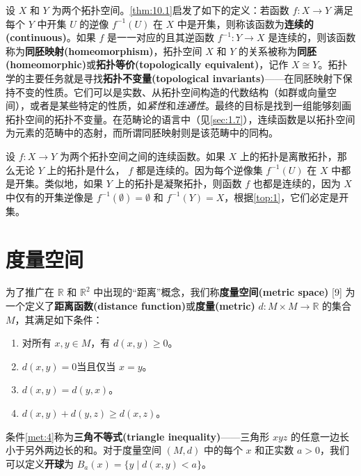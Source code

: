 \begin{theorem}
\begin{theorem}
	设 $X$ 和 $Y$ 为两个拓扑空间。\ref{thm:10.1}启发了如下的定义：若函数 $f:X\rightarrow Y$ 满足每个 $Y$ 中开集 $U$ 的逆像 $f^{-1} (U)$ 在 $X$ 中是开集，则称该函数为\textbf{连续的(continuous)}。如果 $f$ 是一一对应的且其逆函数 $f^{-1} :Y\rightarrow X$ 是连续的，则该函数称为\textbf{同胚映射(homeomorphism)}，拓扑空间 $X$ 和 $Y$ 的关系被称为\textbf{同胚(homeomorphic)}或\textbf{拓扑等价(topologically equivalent)}，记作 $X\cong Y$。拓扑学的主要任务就是寻找\textbf{拓扑不变量(topological invariants)}——在同胚映射下保持不变的性质。它们可以是实数、从拓扑空间构造的代数结构（如群或向量空间），或者是某些特定的性质，如\emph{紧性}和\emph{连通性}。最终的目标是找到一组能够刻画拓扑空间的拓扑不变量。在范畴论的语言中（见\ref{sec:1.7}），连续函数是以拓扑空间为元素的范畴中的态射，而所谓同胚映射则是该范畴中的同构。

\begin{eg}\label{eg:10.10}
	设 $f:X\rightarrow Y$ 为两个拓扑空间之间的连续函数。如果 $X$ 上的拓扑是离散拓扑，那么无论 $Y$ 上的拓扑是什么， $f$ 都是连续的。因为每个逆像集 $f^{-1} (U)$ 在 $X$ 中都是开集。类似地，如果 $Y$ 上的拓扑是凝聚拓扑，则函数 $f$ 也都是连续的，因为 $X$ 中仅有的开集逆像是 $f^{-1} (\emptyset )=\emptyset $ 和 $f^{-1} (Y)=X$，根据\ref{top:1}，它们必定是开集。
\end{eg}

\section{度量空间}

为了推广在 $\mathbb{R}$ 和 $\mathbb{R}^{2}$ 中出现的“距离”概念，我们称\textbf{度量空间(metric space)} [9] 为一个定义了\textbf{距离函数(distance function)}或\textbf{度量(metric)} $d:M\times M\rightarrow \mathbb{R}$ 的集合 $M$，其满足如下条件：

\begin{enumerate}[label=(Met\arabic*),ref=Met\arabic*]
	\item \label{met:1}
	对所有 $x,y\in M$，有 $d(x,y)\geq 0$。
	\item \label{met:2}
	 $d(x,y)=0$当且仅当 $x=y$。
	\item \label{met:3}
	 $d(x,y)=d(y,x)$。
	\item \label{met:4}
	 $d(x,y)+d(y,z)\geq d(x,z)$。
\end{enumerate}

条件\ref{met:4}称为\textbf{三角不等式(triangle inequality)}——三角形 $xyz$ 的任意一边长小于另外两边长的和。对于度量空间 $(M,d)$ 中的每个 $x$ 和正实数 $a >0$，我们可以定义\textbf{开球}为 $B_{a} (x)=\{y\mid d(x,y)< a\}$。


\end{theorem}
\end{theorem}
